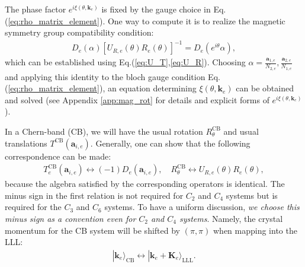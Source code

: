 The phase factor $e^{i \xi(\theta,\mathbf k_e)}$ is fixed by the gauge choice in Eq.(\ref{eq:rho_matrix_element}). One way to compute it is to realize the magnetic symmetry group compatibility condition:
\begin{align}
[U_{R,e}(\theta)R_e(\theta)]D_e(\alpha)[U_{R,e}(\theta)R_e(\theta)]^{-1}=D_e(e^{i\theta}\alpha),\label{eq:R_T_identity}
\end{align}
which can be established using Eq.(\ref{eq:U_T},\ref{eq:U_R}). Choosing $\alpha=\frac{\mathbf a_{1,e}}{N_{2,e}},\frac{\mathbf a_{2,e}}{N_{1,e}}$ and applying this identity to the bloch gauge condition Eq.(\ref{eq:rho_matrix_element}), an equation determining $\xi(\theta,\mathbf k_e)$ can be obtained and solved (see Appendix \ref{app:mag_rot} for details and explicit forms of $e^{i \xi(\theta,\mathbf k_e)}$).


In a Chern-band (CB), we will have the usual rotation $R^{\text{CB}}_{\theta}$ and usual translations $T^{\text{CB}}(\mathbf a_{i,e})$. Generally, one can show that the following correspondence can be made:
\begin{align}
T_e^{\text{CB}}(\mathbf a_{i,e})\leftrightarrow (-1) D_e(\mathbf a_{i,e}),\quad R^{\text{CB}}_{\theta}\leftrightarrow U_{R,e}(\theta)R_e(\theta),\label{eq:CB_map_LLL_symmetry}
\end{align}
because the algebra satisfied by the corresponding operators is identical. The minus sign in the first relation is not required for $C_2$ and $C_4$ systems but is required for the $C_3$ and $C_6$ systems. To have a uniform discussion, \emph{we choose this minus sign as a convention even for $C_2$ and $C_4$ systems}. Namely, the crystal momentum for the CB system will be shifted by $(\pi,\pi)$ when mapping into the LLL: 
\begin{align}
|\mathbf k_e\rangle_{\text{CB}}\leftrightarrow |\mathbf k_e+\mathbf K_e\rangle_{\text{LLL}}.\label{eq:CB_LLL_map}
\end{align}

